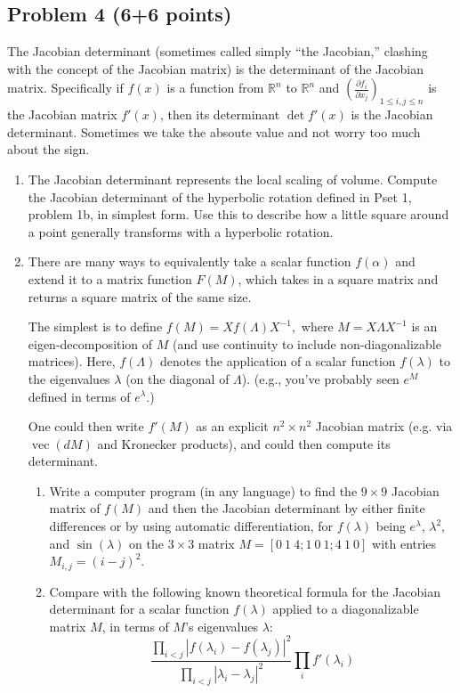 \documentclass{article}
\newcommand{\vecm}{\operatorname{vec}}
\begin{document}
\subsection*{Problem 4 (6+6 points)}
The Jacobian determinant (sometimes called simply ``the Jacobian,'' clashing with the concept of the Jacobian matrix) is
the determinant of the Jacobian matrix.  Specifically if $f(x)$ is a function from $\mathbb{R}^n$ to $\mathbb{R}^n$ and
$(\frac{\partial f_i}{\partial x_j})_{1 \le i,j \le n}$ is the Jacobian matrix $f'(x)$, then its determinant $\det f'(x)$ is the Jacobian determinant.
Sometimes we take the absoute value and not worry too much about the sign.


\begin{enumerate}
\item The Jacobian determinant represents the  local scaling of volume.  Compute the Jacobian determinant of the
hyperbolic rotation defined in Pset 1, problem 1b, in simplest form.  Use this to describe how a little square
around a point generally transforms with a hyperbolic rotation.

\item   There are many ways to equivalently take a scalar function $f(\alpha)$ and extend it to a matrix function $F(M)$, which takes in a square matrix and returns a square matrix of the same size.

The simplest is to define
$f(M)=X f(\Lambda) X^{-1},$ where $M=X\Lambda X^{-1}$ is an eigen-decomposition of $M$ (and use continuity to include
non-diagonalizable matrices).  Here, $f(\Lambda)$ denotes the application of a scalar function $f(\lambda)$ to the eigenvalues $\lambda$ (on the diagonal of $\Lambda$).  (e.g., you've probably seen $e^M$ defined in terms of $e^\lambda$.)

One could then write $f'(M)$ as an explicit $n^2\times n^2$ Jacobian matrix (e.g. via $\vecm(dM)$ and Kronecker products), and could then  compute its determinant.

\begin{enumerate}

\item Write a computer program (in any language) to find the $9\times 9$ Jacobian matrix of $f(M)$ and then the Jacobian determinant  by either finite differences or by using
automatic differentiation, for $f(\lambda)$ being $e^\lambda$, $\lambda^2$, and $\sin(\lambda)$ on the $3\times 3$ matrix $M = [0\: 1\: 4;1\: 0\: 1;4\: 1\: 0]$ with entries $M_{i,j} = (i-j)^2$.

\item Compare with the following known theoretical formula for the 
Jacobian determinant for a scalar function $f(\lambda)$ applied to a diagonalizable matrix $M$,  in terms of $M$'s eigenvalues $\lambda$:
$$
\frac{\prod_{i < j} |f(\lambda_i)-
f(\lambda_j)|^2}{\prod_{i < j} |\lambda_i-\lambda_j|^2}
\prod_i f'(\lambda_i)
$$

\end{enumerate}



\end{enumerate}
\end{document}
